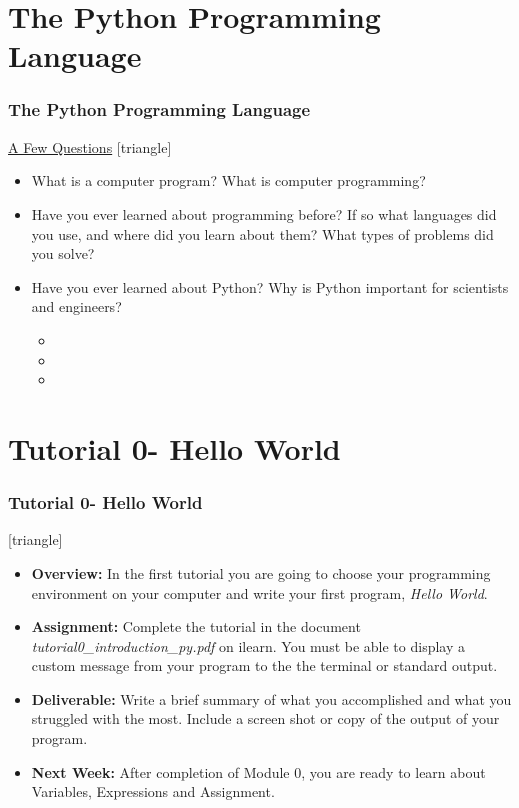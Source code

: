 \documentclass[fleqn]{beamer} %
\newcommand{\MNUM}{0\hspace{2mm}} %
\newcommand{\sectiontitleIV}{The Python Programming Language}
\newcommand{\sectiontitleV}{Tutorial \MNUM - Hello World}
\begin{document}
\section{\sectiontitleIV}	
	\begin{frame}[label=sectionIV] \small
		\frametitle{\sectiontitleIV}    
		
		\underline{A Few Questions}
		[triangle]
		\begin{itemize}
			
			\item What is a computer program? What is computer programming?
			
			\item Have you ever learned about programming before? If so what languages did you use, and where did you learn about them? What types of problems did you solve?
			
			\item Have you ever learned about Python? Why is Python important for scientists and engineers? 
				\begin{itemize}
					\item 
					\item
					\item
				\end{itemize}
			
			
		\end{itemize}
	\end{frame}

\section{\sectiontitleV}	
	            \begin{frame}[label=sectionV] \small
		\frametitle{\sectiontitleV}    
	
 [triangle]
                \begin{itemize}

					\item {\bf Overview:} In the first tutorial you are going to choose your programming environment on your computer and write your first program, {\it Hello World}.  		

					\item {\bf Assignment:} Complete the tutorial in the document {\it tutorial\MNUM\_introduction\_py.pdf } on ilearn. You must be able to display a custom message from your program to the the terminal or standard output.
                    
                    \item {\bf Deliverable:} Write a brief summary of what you accomplished and what you struggled with the most. Include a screen shot or copy of the output of your program.   
    
                    \item {\bf Next Week:} After completion of Module \MNUM, you are ready to learn about Variables, Expressions and Assignment. \vspc
                    
       
                \end{itemize}
		\end{frame}
\end{document}
